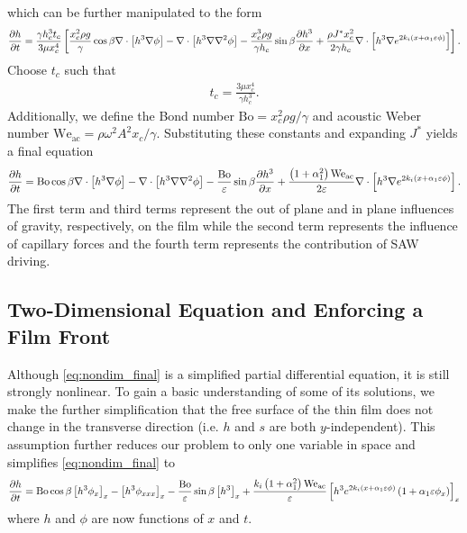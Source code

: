 which can be further manipulated to the form 
\begin{align*}
    \frac{\partial h}{\partial t} = \frac{\gamma h_c^3 t_c}{3\mu x_c^4} \left[ 
        \frac{x_c^2 \rho g}{\gamma} \cos \beta \nabla \cdot \left[ h^3\nabla\phi \right] - 
        \nabla \cdot \left[ h^3 \nabla \nabla^2 \phi \right] - 
        \frac{x_c^3 \rho g}{\gamma h_c} \sin\beta \frac{\partial h^3}{\partial x} + 
        \frac{\rho J^* x_c^2}{2 \gamma h_c} \nabla \cdot \left[ h^3 \nabla e^{2k_i \left( x + \alpha_1 \varepsilon \phi \right)} \right]
     \right].
\end{align*}
Choose $t_c$ such that 
\begin{align*}
    t_c = \frac{3\mu x_c^4}{\gamma h_c^3}.
\end{align*}
Additionally, we define the Bond number $\mathrm{Bo} = x_c^2 \rho g / \gamma$ and acoustic Weber number
$\mathrm{We_{ac}} = \rho \omega^2 A^2 x_c / \gamma$. 
Substituting these constants and expanding $J^*$ yields a final equation
\begin{align}
    \frac{\partial h}{\partial t} = \mathrm{Bo} \cos\beta \nabla \cdot \left[  h^3 \nabla \phi  \right] - 
    \nabla \cdot \left[ h^3 \nabla\nabla^2\phi  \right] - 
    \frac{\mathrm{Bo}}{\varepsilon} \sin\beta \frac{\partial h^3}{\partial x} + 
    \frac{\left( 1 + \alpha_1^2 \right) \mathrm{We_{ac}}}{2\varepsilon} \nabla \cdot \left[ h^3 \nabla e^{2k_i \left( x + \alpha_1 \varepsilon \phi \right)} \right]. 
    \label{eq:nondim_final}
\end{align}   
The first term and third terms represent the out of plane and in plane influences of gravity, respectively, on 
the film while the second term represents the influence of capillary forces and the fourth term represents the 
contribution of SAW driving.  

\subsection{Two-Dimensional Equation and Enforcing a Film Front}
Although \cref{eq:nondim_final} is a simplified partial differential equation, 
it is still strongly nonlinear. To gain a basic understanding of some of its solutions,
we make the further simplification that the free surface of the thin film does not change
in the transverse direction (i.e.\! $h$ and $s$ are both $y$-independent). This assumption
further reduces our problem to only one variable in space and simplifies \cref{eq:nondim_final} to 
\begin{align}
    \frac{\partial h}{\partial t} = \mathrm{Bo}\cos\beta \left[ h^3 \phi_x \right]_x - \left[ h^3 \phi_{xxx} \right]_{x} - \frac{\mathrm{Bo}}{\varepsilon} \sin\beta \left[ h^3 \right]_{x} + 
    \frac{k_i \left( 1 + \alpha_1^2 \right)\mathrm{We_{ac}}}{\varepsilon} \left[ h^3 e^{2k_i \left( x + \alpha_1 \varepsilon \phi \right)} \left( 1 + \alpha_1 \varepsilon \phi_x \right) \right]_x
    \label{eq:two_dim_final}
\end{align}
where $h$ and $\phi$ are now functions of $x$ and $t$.

